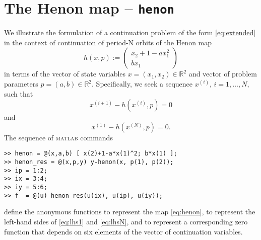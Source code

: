 \section{The Henon map -- \texttt{henon}}
We illustrate the formulation of a continuation problem of the form \eqref{eq:extended} in the context of continuation of period-N orbits of the Henon map
\begin{equation}
\label{eq:henon}
h(x,p):=\left(\begin{array}{c}x_2+1-ax_1^2\\bx_1\end{array}\right)
\end{equation}
in terms of the vector of state variables $x=(x_1,x_2)\in\mathbb{R}^2$ and vector of problem parameters $p=(a,b)\in\mathbb{R}^2$. Specifically, we seek a sequence $x^{(i)}$, $i=1,\ldots,N$, such that
\begin{equation}
\label{eq:lhs1}
x^{(i+1)}-h(x^{(i)},p)=0
\end{equation}
and
\begin{equation}
\label{eq:lhsN}
x^{(1)}-h(x^{(N)},p)=0.
\end{equation}
The sequence of \textsc{matlab} commands
\begin{lstlisting}[language=coco-highlight]
>> henon = @(x,a,b) [ x(2)+1-a*x(1)^2; b*x(1) ];
>> henon_res = @(x,p,y) y-henon(x, p(1), p(2));
>> ip = 1:2;
>> ix = 3:4;
>> iy = 5:6;
>> f  = @(u) henon_res(u(ix), u(ip), u(iy));
\end{lstlisting}
define the anonymous functions  to represent the map \eqref{eq:henon},  to represent the left-hand sides of \eqref{eq:lhs1} and \eqref{eq:lhsN}, and  to represent a corresponding zero function that depends on six elements of the vector of continuation variables. 


